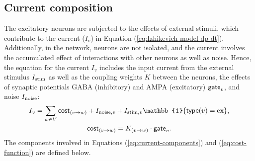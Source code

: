 \subsection{Current composition}
\label{sec:current-composition}

The excitatory neurons are subjected to the effects of external stimuli, which contribute to the current ($I_v$) in Equation (\ref{eq:Izhikevich-model-dp-dt}). Additionally, in the network, neurons are not isolated, and the current involves the accumulated effect of interactions with other neurons as well as noise. 
Hence, the equation for the current $I_v$ includes the input current from the external stimulus $I_{\mathrm{stim}}$ as well as the coupling weights $K$ between the neurons, the effects of synaptic potentials GABA (inhibitory) and AMPA (excitatory) $\mathsf{gate}_v$, and noise $I_{\mathrm{noise}}$:
\begin{gather}
    I_v = 
    \sum_{w \in V} \cost_{(v \to w)} + I_{\noise, v} + I_{\stim, v} \mathbb{1} \{ \type(v) = \ex \},  \label{eq:current-components} \\
    \cost_{(v \to w)} = K_{(v \to w)} \cdot \synapticgate_v. 
    \label{eq:cost-function}
\end{gather}
The components involved in Equations (\ref{eq:current-components}) and (\ref{eq:cost-function}) are defined below.

\begin{comment}

The definition of each component is provided in the next three sections.

In this project, the external input ($I_{\stim}$) is provided by a set of texture stimuli, and a grid network of PING oscillators is supposed to reflect local neural networks of the primary visual cortex (V1). The external stimuli is described in Section \ref{sec:external-stimuli}.

\end{comment}








